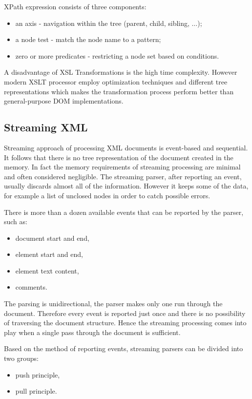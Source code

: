 \documentclass[11pt,oneside,final]{fithesis2}
\begin{document}
XPath expression consists of three components: 
\begin{itemize}
\item an axis - navigation within the tree (parent, child, sibling, $\ldots$);
\item a node test - match the node name to a pattern;
\item zero or more predicates - restricting a node set based on conditions.
\end{itemize}

A disadvantage of XSL Transformations is the high time complexity. However modern XSLT processor employ optimization techniques and different tree representations which makes the transformation process perform better than general-purpose DOM implementations.

\subsection{Streaming XML}
Streaming approach of processing XML documents is event-based and sequential. It follows that there is no tree representation of the document created in the memory. In fact the memory requirements of streaming processing are minimal and often considered negligible. The streaming parser, after reporting an event, usually discards almost all of the information. However it keeps some of the data, for example a list of unclosed nodes in order to catch possible errors. 

There is more than a dozen available events that can be reported by the parser, such as:
\begin{itemize}
\item document start and end,
\item element start and end,
\item element text content,
\item comments.  
\end{itemize}

The parsing is unidirectional, the parser makes only one run through the document. Therefore every event is reported just once and there is no possibility of traversing the document structure. Hence the streaming processing comes into play when a single pass through the document is sufficient.

Based on the method of reporting events, streaming parsers can be divided into two groups:
\begin{itemize}
\item push principle,
\item pull principle.
\end{itemize}
\end{document}
